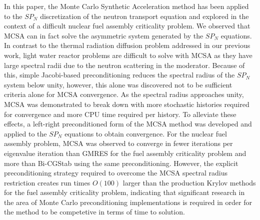 \documentclass[letterpaper,11pt]{article}
\begin{document}
In this paper, the Monte Carlo Synthetic Acceleration method has been
applied to the $SP_N$ discretization of the neutron transport equation
and explored in the context of a difficult nuclear fuel assembly
criticality problem. We observed that MCSA can in fact solve the
asymmetric system generated by the $SP_N$ equations. In contrast to
the thermal radiation diffusion problem addressed in our previous
work, light water reactor problems are difficult to solve with MCSA as
they have large spectral radii due to the neutron scattering in the
moderator. Because of this, simple Jacobi-based preconditioning
reduces the spectral radius of the $SP_N$ system below unity, however,
this alone was discovered not to be sufficient criteria alone for MCSA
convergence. As the spectral radius approaches unity, MCSA was
demonstrated to break down with more stochastic histories required for
convergence and more CPU time required per history. To alleviate these
effects, a left-right preconditioned form of the MCSA method was
developed and applied to the $SP_N$ equations to obtain
convergence. For the nuclear fuel assembly problem, MCSA was observed
to converge in fewer iterations per eigenvalue iteration than GMRES
for the fuel assembly criticality problem and more than Bi-CGStab
using the same preconditioning. However, the explicit preconditioning
strategy required to overcome the MCSA spectral radius restriction
creates run times $O(100)$ larger than the production Krylov methods
for the fuel assembly criticality problem, indicating that significant
research in the area of Monte Carlo preconditioning implementations is
required in order for the method to be competetive in terms of time to
solution.

\pagebreak
 

\end{document}
